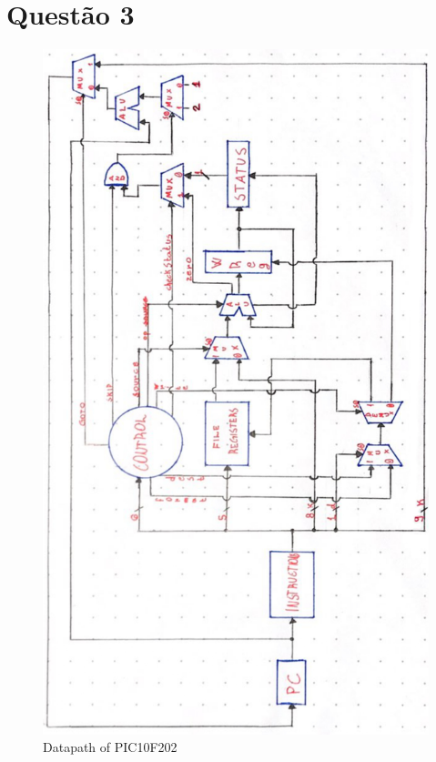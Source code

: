 \documentclass[12pt]{report}
\begin{document}
	\section*{Questão 3}
		\begin{figure}
			\centering
			\includegraphics[scale = 0.82621]{datapath.jpg}
			\caption{Datapath of PIC10F202}
			\label{datapath}
		\end{figure}
	\clearpage
\end{document}
